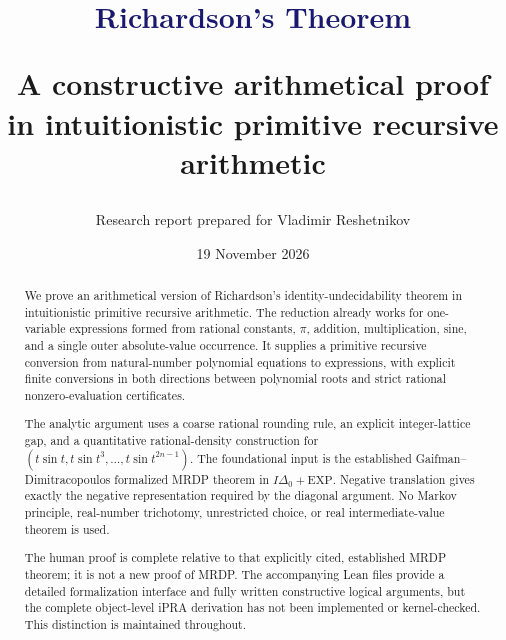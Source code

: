 \documentclass[11pt,a4paper]{article}
\title{\vspace{-10mm}\textcolor{MidnightBlue}{Richardson's Theorem}\par\large A constructive arithmetical proof in intuitionistic primitive recursive arithmetic}
\author{Research report prepared for Vladimir Reshetnikov}
\date{19 November 2026}
\theoremstyle{definition}
\begin{document}
\maketitle
\begin{abstract}
We prove an arithmetical version of Richardson's identity-undecidability theorem in intuitionistic primitive recursive arithmetic. The reduction already works for one-variable expressions formed from rational constants, $\pi$, addition, multiplication, sine, and a single outer absolute-value occurrence. It supplies a primitive recursive conversion from natural-number polynomial equations to expressions, with explicit finite conversions in both directions between polynomial roots and strict rational nonzero-evaluation certificates.

The analytic argument uses a coarse rational rounding rule, an explicit integer-lattice gap, and a quantitative rational-density construction for $(t\sin t,t\sin t^3,\ldots,t\sin t^{2n-1})$. The foundational input is the established Gaifman--Dimitracopoulos formalized MRDP theorem in $I\Delta_0+\mathrm{EXP}$. Negative translation gives exactly the negative representation required by the diagonal argument. No Markov principle, real-number trichotomy, unrestricted choice, or real intermediate-value theorem is used.

The human proof is complete relative to that explicitly cited, established MRDP theorem; it is not a new proof of MRDP. The accompanying Lean files provide a detailed formalization interface and fully written constructive logical arguments, but the complete object-level iPRA derivation has not been implemented or kernel-checked. This distinction is maintained throughout.
\end{abstract}
\vspace{2mm}
\noindent{}
\clearpage
\tableofcontents
\newpage





\end{document}
